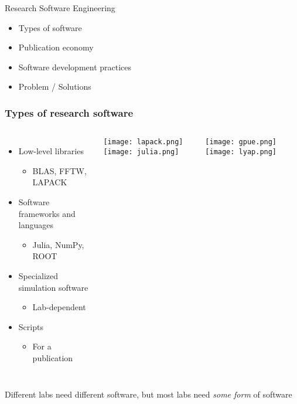 \documentclass{beamer}
\begin{document}
\begin{frame}
\begin{centering}
\Huge Research Software Engineering 
\end{centering}

\Large
\pause
\begin{itemize}
\item Types of software
\pause
\item Publication economy
\pause
\item Software development practices
\pause
\item Problem / Solutions
\end{itemize}

\end{frame}

\begin{frame}
\frametitle{Types of research software}

\begin{columns}
\begin{itemize}
\item Low-level libraries
\begin{itemize}
\item BLAS, FFTW, LAPACK
\end{itemize}
\item Software frameworks and languages
\begin{itemize}
\item Julia, NumPy, ROOT
\end{itemize}
\item Specialized simulation software
\begin{itemize}
\item Lab-dependent
\end{itemize}
\item Scripts
\begin{itemize}
\item For a publication
\end{itemize}
\end{itemize}

\begin{columns}
\texttt{[image: lapack.png]}
\texttt{[image: julia.png]}
\end{columns}
\begin{columns}
\texttt{[image: gpue.png]}
\texttt{[image: lyap.png]}
\end{columns}
\begin{columns}
\centering [1]
\centering [2]
\end{columns}
\end{columns}
\begin{center}
\large Different labs need different software, but most labs need \textit{some form} of software


\end{center}
\end{frame}
\end{document}
